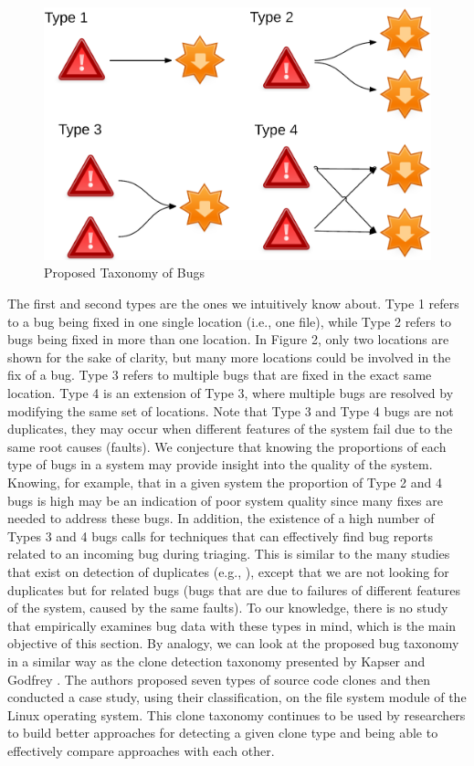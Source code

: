 \begin{figure}[h!]
  \centering
    \includegraphics[scale=0.6]{media/bug-taxo.png}
    \caption{Proposed Taxonomy of Bugs
    \label{fig:bug-taxo}}
\end{figure}


The first and second types are the ones we intuitively know
about.
Type 1 refers to a bug being fixed in one single location (i.e., one file), while Type 2 refers to bugs being fixed in more than one location.
In Figure 2, only two locations are shown for the sake of clarity, but many more locations could be involved in the fix of a bug.
Type 3 refers to multiple bugs that are fixed in the exact same location.
Type 4 is an extension of Type 3, where multiple bugs are resolved by modifying the same set of locations.
Note that Type 3 and Type 4 bugs are not duplicates, they may occur when different features of the system fail due to the same root causes (faults).
We conjecture that knowing the proportions of each type of bugs in a system may provide insight into the quality of the system.
Knowing, for example, that in a given system the proportion of Type 2 and 4 bugs is high may be an indication of poor system quality since many fixes are needed to address these bugs.
In addition, the existence of a high number of Types 3 and 4 bugs calls for techniques that can effectively find bug reports related to an incoming bug during triaging.
This is similar to the many studies that exist on detection of duplicates (e.g., \cite{Runeson2007,Sun2010,Nguyen2012}), except that we are not looking for duplicates but for related bugs (bugs that are due to failures of different features of the system, caused by the same faults).
To our knowledge, there is no study that empirically examines bug data with these types in mind, which is the main objective of this section.  By analogy, we can look at the proposed bug taxonomy in a similar way as the clone detection taxonomy presented by Kapser and Godfrey \cite{CoryKapser}. The authors proposed seven types of source code clones and then conducted a case study, using their classification, on the file system module of the Linux operating system. This clone taxonomy continues to be used by researchers to build better approaches for detecting a given clone type and being able to effectively compare approaches with each other.


